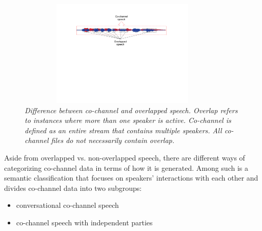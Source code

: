 \begin{figure}[h!]
	\centering
	\vspace{0mm}
	\includegraphics[height = 2in, width=0.9\textwidth]{figures/cochannel_vs_overlap-crop}
	\vspace{-3mm}
	\caption{\it \small Difference between co-channel and overlapped speech. Overlap refers to instances where more than one speaker is active. Co-channel is defined as an entire stream that contains multiple speakers. All co-channel files do not necessarily contain overlap. }
	\label{fig:cochannel_vs_overlap}
	\vspace{-3mm}
\end{figure}



Aside from overlapped vs. non-overlapped speech, there are different ways of categorizing co-channel data in terms of how it is generated. 
Among such is a semantic classification that focuses on speakers' interactions with each other and divides co-channel data into two subgroups: 
\begin{itemize}
	\item conversational co-channel speech
	\item co-channel speech with independent parties
\end{itemize} 

